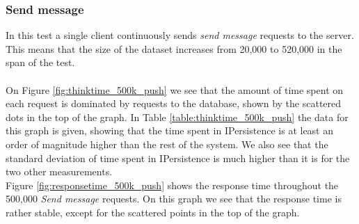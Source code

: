 \documentclass{article}
\begin{document}
            \subsubsection{Send message}
                \label{sec:micro_send_message}
                In this test a single client continuously sends \textit{send message} requests to the server. This means that the size of the dataset increases from 20,000 to 520,000 in the span of the test.\\
                \\
                On Figure \ref{fig:thinktime_500k_push} we see that the amount of time spent on each request is dominated by requests to the database, shown by the scattered dots in the top of the graph. In Table \ref{table:thinktime_500k_push} the data for this graph is given, showing that the time spent in IPersistence is at least an order of magnitude higher than the rest of the system. We also see that the standard deviation of time spent in IPersistence is much higher than it is for the two other measurements.\\
                Figure \ref{fig:responsetime_500k_push} shows the response time throughout the 500,000 \textit{Send message} requests. On this graph we see that the response time is rather stable, except for the scattered points in the top of the graph.
\end{document}
